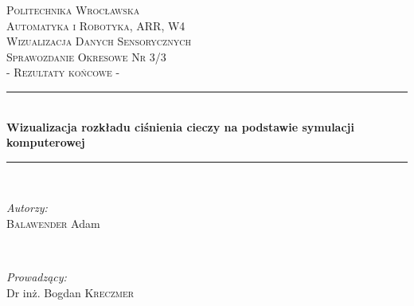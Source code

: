\begin{titlepage}

\newcommand{\HRule}{\rule{\linewidth}{0.5mm}} %

\center %


\textsc{\LARGE Politechnika Wrocławska\\}
\vspace{0.5cm}
\textsc{\large Automatyka i Robotyka, ARR, W4}\\[4.5cm] %

\textsc{\Large Wizualizacja Danych Sensorycznych}\\[0.5cm] %
\textsc{\large Sprawozdanie Okresowe Nr 3/3 \\ - Rezultaty końcowe -}\\[0.5cm] %


\HRule \\[0.6cm]
{ \huge \bfseries Wizualizacja rozkładu ciśnienia cieczy na podstawie symulacji komputerowej}\\[0.6cm] %
\HRule \\[3.5cm]


\begin{minipage}{0.4\textwidth}
\begin{flushleft} \large
\emph{Autorzy:}\\
\textsc{Balawender} Adam %
\end{flushleft}
\end{minipage}
~
\begin{minipage}{0.4\textwidth}
\begin{flushright} \large
\emph{Prowadzący:} \\
Dr inż. Bogdan \textsc{Kreczmer} %
\end{flushright}
\end{minipage}\\[0.1cm]


\end{titlepage}
